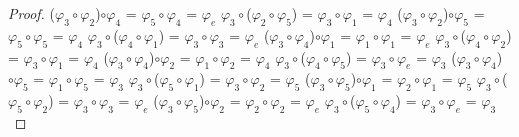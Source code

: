 \documentclass[10pt,a4paper,oneside]{article}
\begin{document}
\begin{proof}
				\newline
				($\varphi_{3}\circ\varphi_{2}$)$\circ\varphi_{4}$ = $\varphi_{5}\circ\varphi_{4}$ = $\varphi_{e}$
				\newline
				\newline
				$\varphi_{3}\circ$($\varphi_{2}\circ\varphi_{5}$) = $\varphi_{3}\circ\varphi_{1}$ = $\varphi_{4}$
				\newline
				($\varphi_{3}\circ\varphi_{2}$)$\circ\varphi_{5}$ = $\varphi_{5}\circ\varphi_{5}$ = $\varphi_{4}$
				\newline
				\newline
				$\varphi_{3}\circ$($\varphi_{4}\circ\varphi_{1}$) = $\varphi_{3}\circ\varphi_{3}$ = $\varphi_{e}$
				\newline
				($\varphi_{3}\circ\varphi_{4}$)$\circ\varphi_{1}$ = $\varphi_{1}\circ\varphi_{1}$ = $\varphi_{e}$
				\newline
				\newline
				$\varphi_{3}\circ$($\varphi_{4}\circ\varphi_{2}$) = $\varphi_{3}\circ\varphi_{1}$ = $\varphi_{4}$
				\newline
				($\varphi_{3}\circ\varphi_{4}$)$\circ\varphi_{2}$ = $\varphi_{1}\circ\varphi_{2}$ = $\varphi_{4}$
				\newline
				\newline
				$\varphi_{3}\circ$($\varphi_{4}\circ\varphi_{5}$) = $\varphi_{3}\circ\varphi_{e}$ = $\varphi_{3}$
				\newline
				($\varphi_{3}\circ\varphi_{4}$)$\circ\varphi_{5}$ = $\varphi_{1}\circ\varphi_{5}$ = $\varphi_{3}$
				\newline
				\newline
				$\varphi_{3}\circ$($\varphi_{5}\circ\varphi_{1}$) = $\varphi_{3}\circ\varphi_{2}$ = $\varphi_{5}$
				\newline
				($\varphi_{3}\circ\varphi_{5}$)$\circ\varphi_{1}$ = $\varphi_{2}\circ\varphi_{1}$ = $\varphi_{5}$
				\newline
				\newline
				$\varphi_{3}\circ$($\varphi_{5}\circ\varphi_{2}$) = $\varphi_{3}\circ\varphi_{3}$ = $\varphi_{e}$
				\newline
				($\varphi_{3}\circ\varphi_{5}$)$\circ\varphi_{2}$ = $\varphi_{2}\circ\varphi_{2}$ = $\varphi_{e}$
				\newline
				\newline
				$\varphi_{3}\circ$($\varphi_{5}\circ\varphi_{4}$) = $\varphi_{3}\circ\varphi_{e}$ = $\varphi_{3}$
				\newline

\end{proof}
\end{document}
